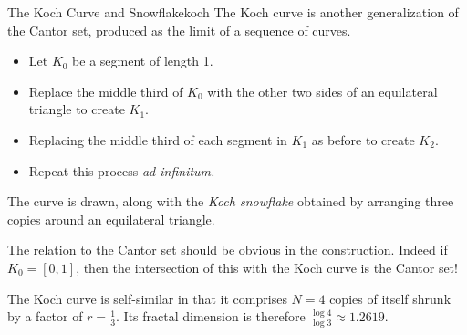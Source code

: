 	\begin{example}{The Koch Curve and Snowflake}{koch}
	The Koch curve is another generalization of the Cantor set, produced as the limit of a sequence of curves.\par
	\begin{minipage}[t]{0.64\linewidth}\vspace{-5pt}
		\begin{itemize}\itemsep0pt
		  \item Let $K_0$ be a segment of length 1.
		  \item Replace the middle third of $K_0$ with the other two sides of an equilateral triangle to create $K_1$.
		  \item Replacing the middle third of each segment in $K_1$ as before to create $K_2$.
		  \item Repeat this process \emph{ad infinitum.}
		\end{itemize}
		The curve is drawn, along with the \emph{Koch snowflake} obtained by arranging three copies around an equilateral triangle.\smallbreak
		
		The relation to the Cantor set should be obvious in the construction. Indeed if $K_0=[0,1]$, then the intersection of this with the Koch curve is the Cantor set!\smallbreak
		
		The Koch curve is self-similar in that it comprises $N=4$ copies of itself shrunk by a factor of $r=\frac 13$. Its fractal dimension is therefore $\frac{\log 4}{\log 3}\approx 1.2619$.\smallbreak
		

\end{minipage}
\end{example}
